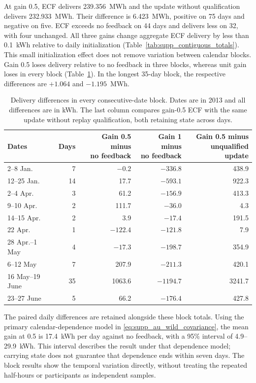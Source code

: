\documentclass[11pt]{article}
\begin{document}
At gain 0.5, ECF delivers 239.356~MWh and the update without qualification
delivers 232.933~MWh. Their difference is 6.423~MWh, positive on 75 days
and negative on five. ECF exceeds no feedback on 44 days and delivers less
on 32, with four unchanged. All three gains change aggregate ECF delivery
by less than 0.1~kWh relative to daily initialization
(Table~\ref{tab:supp_contiguous_totals}). This small initialization effect
does not remove variation between calendar blocks. Gain 0.5 loses delivery
relative to no feedback in three blocks, whereas unit gain loses in every
block (Table~\ref{tab:supp_contiguous_blocks}). In the longest 35-day block,
the respective differences are $+1.064$ and $-1.195$~MWh.

\begin{table}[!ht]
\centering
\caption{Delivery differences in every consecutive-date block. Dates are
in 2013 and all differences are in kWh. The last column compares gain-0.5
ECF with the same update without replay qualification, both retaining
state across days.}
\label{tab:supp_contiguous_blocks}
\vspace{3pt}
\small
\begin{tabular}{@{}lrrrr@{}}
\toprule
Dates & Days & \shortstack{Gain 0.5 minus\\no feedback} &
\shortstack{Gain 1 minus\\no feedback} &
\shortstack{Gain 0.5 minus\\unqualified update} \\
\midrule
2--8 Jan. & 7 & $-0.2$ & $-336.8$ & 438.9 \\
12--25 Jan. & 14 & 17.7 & $-593.1$ & 922.3 \\
2--4 Apr. & 3 & 61.2 & $-156.9$ & 413.3 \\
9--10 Apr. & 2 & 111.7 & $-36.0$ & 4.3 \\
14--15 Apr. & 2 & 3.9 & $-17.4$ & 191.5 \\
22 Apr. & 1 & $-122.4$ & $-121.8$ & 7.9 \\
28 Apr.--1 May & 4 & $-17.3$ & $-198.7$ & 354.9 \\
6--12 May & 7 & 207.9 & $-211.3$ & 420.1 \\
16 May--19 June & 35 & 1063.6 & $-1194.7$ & 3241.7 \\
23--27 June & 5 & 66.2 & $-176.4$ & 427.8 \\
\bottomrule
\end{tabular}
\end{table}

The paired daily differences are retained alongside these block totals.
Using the primary calendar-dependence model in
\eqref{eq:supp_au_wild_covariance},
the mean gain at 0.5 is 17.4~kWh per day against no feedback, with a 95\%
interval of 4.9--29.9~kWh. This interval describes the result under that
dependence model; carrying state does not guarantee that dependence ends
within seven days. The block results show the temporal variation directly,
without treating the repeated half-hours or participants as independent samples.
\end{document}
